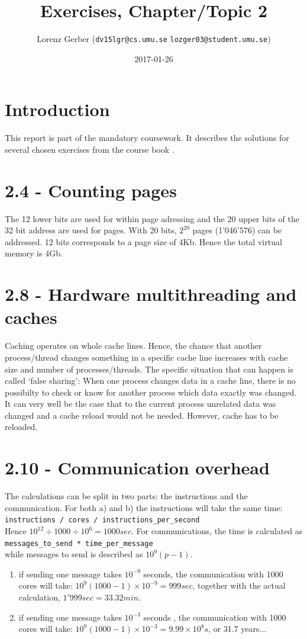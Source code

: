 \documentclass[a4paper,11pt,twoside]{article}
\title{Exercises, Chapter/Topic 2}
\author{Lorenz Gerber ({\tt{dv15lgr@cs.umu.se}} {\tt{lozger03@student.umu.se}})}
\date{2017-01-26}
\begin{document}
\lstset{language=C}
\maketitle
\thispagestyle{empty}
\newpage
\tableofcontents
\thispagestyle{empty}
\newpage

\clearpage
{}

\section{Introduction}
This report is part of the mandatory coursework. It describes the solutions for several chosen exercises from the course book \cite{pacheco2011}.
\section{2.4 - Counting pages}
The 12 lower bits are used for within page adressing and the 20 upper bits of the 32 bit address are used for pages. With 20 bits, $2^{20}$ pages (1'046'576) can be addressed. 12 bits corresponds to a page size of 4Kb. Hence the total virtual memory is 4Gb. 
\section{2.8 - Hardware multithreading and caches}
Caching operates on whole cache lines. Hence, the chance that another process/thread changes something in a specific cache line increases with cache size and number of processes/threads. The specific situation that can happen is called `false sharing': When one process changes data in a cache line, there is no possibilty to check or know for another process which data exactly was changed. It can very well be the case that to the current process unrelated data was changed and a cache reload would not be needed. However, cache has to be reloaded. 
\section{2.10 - Communication overhead}
The calculations can be split in two parts: the instructions and the communication. For both a) and b) the instructions will take the same time:\\
\verb+instructions / cores / instructions_per_second+\\
Hence $10^{12} \div 1000 \div 10^{6} = 1000 sec$. For communications, the time is calculated as\\
\verb+messages_to_send * time_per_message+\\
while messages to send is described as $10^{9}(p-1)$. 
\begin{enumerate}[label={\alph*)}]
\item if sending one message takes $10^{-9}$ seconds, the communication with 1000 cores will take: $10^{9}(1000-1) \times 10^{-9} = 999 sec$, together with the actual calculation, $1'999 sec = 33.32min$.
\item if sending one message takes $10^{-3}$ seconds , the communication with 1000 cores will take: $10^{9}(1000-1) \times 10^{-3} = 9.99\times10^{8} s$, or 31.7 years...
\end{enumerate}
\end{document}

